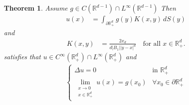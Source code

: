 \documentclass{report}
\theoremstyle{tommy}
\newtheorem{thm}[defn]{Theorem}
\begin{document}
  \begin{thm}
    Assume \(g \in C(\mathbb{R}^{d-1}) \cap L^\infty(\mathbb{R}^{d-1})\) Then 
    \begin{align*}
      u(x) &= \int_{\partial \mathbb{R}_+^d} g(y) K(x,y) \, dS(y)
    \end{align*}
    and 
    \begin{align*}
      K(x,y) &= \frac{2 x_d}{d|B_1||y-x|^d} \quad \text{for all \(x \in \mathbb{R}_+^d\).}
    \end{align*}
    satisfies that \(u \in C^\infty(\mathbb{R}_+^d) \cap L^\infty(\mathbb{R}_+^d)\) and 
    \begin{align*}
      \begin{cases}
        \Delta u = 0 & \text{in } \mathbb{R}_+^d \\ \lim_{\substack{x \to 0 \\ x \in \mathbb{R}_+^d}} u(x) = g(x_0) & \forall x_0 \in \partial \mathbb{R}_+^d
      \end{cases}
    \end{align*}
  \end{thm}
  
\end{document}

